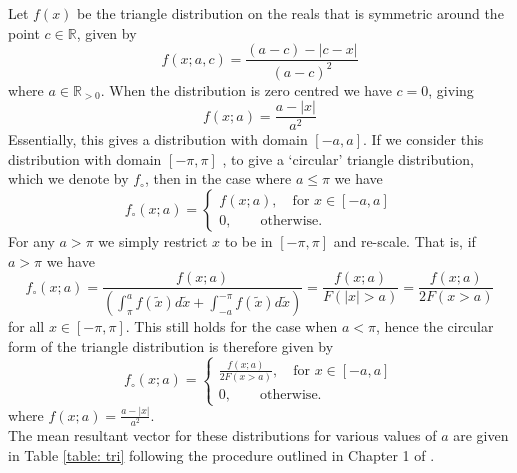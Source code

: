\documentclass[english]{article}
\begin{document}
\begin{appendices}
Let $f(x)$ be the triangle distribution on the reals that is symmetric around the point $c\in \mathbb{R}$, given by
\begin{equation}\nonumber
    f(x;a,c)=\frac{(a-c)-\lvert c-x\rvert}{(a-c)^2}
\end{equation}
where $a\in \mathbb{R}_{>0}$.   When the distribution is zero centred we have $c=0$, giving
\begin{equation}\nonumber
    f(x;a)=\frac{a-\lvert x\rvert}{a^2}
\end{equation}
Essentially, this gives a distribution with domain  $[-a, a]$.   If we consider this distribution with domain $[-\pi,\pi]$ , to give a `circular' triangle distribution, which we denote by $f_\circ$, then in the case where $a\leq\pi$ we have
\begin{equation}\nonumber
    f_\circ(x;a)=\begin{cases}f(x;a), \quad \text{for }x\in [-a,a]\\
    0,\qquad \text{otherwise.}
    \end{cases}
\end{equation}
 For any $a>\pi$ we simply restrict $x$ to be in $[-\pi,\pi]$ and re-scale.  That is, if $a>\pi$  we have
\begin{equation}\nonumber
f_\circ(x;a)=\frac{f(x;a)}{\left(\int_\pi^a f(\tilde{x})d\tilde{x}+\int_
{-a}^{-\pi} f(\tilde{x})d\tilde{x}\right)} = \frac{f(x;a)}{F(\lvert x\rvert>a)}=\frac{f(x;a)}{2F(x>a)}
\end{equation} 
for all $x\in[-\pi,\pi]$.  This still holds for the case when $a<\pi$, hence the circular form of the triangle distribution is therefore given by
\begin{equation}\nonumber
    f_\circ(x;a)=\begin{cases}\frac{f(x;a)}{2F(x>a)}, \quad \text{for }x\in [-a,a]\\
    0,\qquad \text{otherwise.}
    \end{cases}
\end{equation} where $f(x;a)=\frac{a-\lvert x\rvert}{a^2}$.\\

The mean resultant vector for these distributions for various values of $a$ are given in Table \ref{table: tri} following the procedure outlined in Chapter 1 of \citet{jammalamadaka2001topics}.


\end{appendices}
\end{document}
